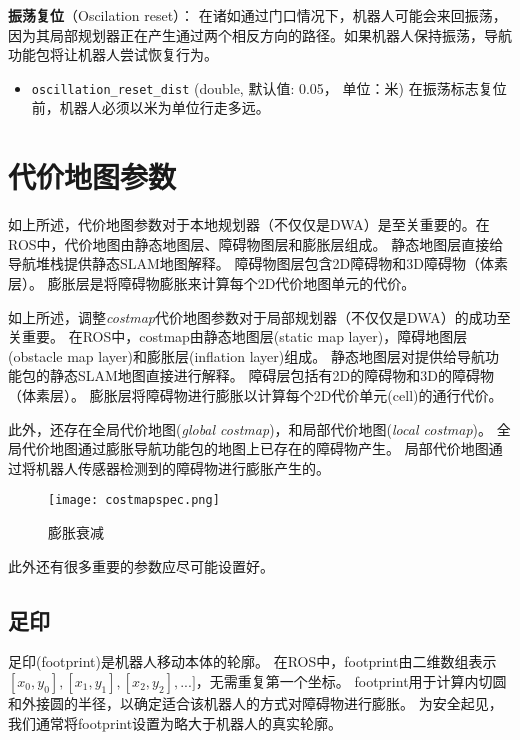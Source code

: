 \textbf{振荡复位}（Oscilation reset）：
在诸如通过门口情况下，机器人可能会来回振荡，因为其局部规划器正在产生通过两个相反方向的路径。如果机器人保持振荡，导航功能包将让机器人尝试恢复行为。

\begin{itemize}
	\item \texttt{oscillation_reset_dist} (double, 默认值: 0.05， 单位：米) 
	在振荡标志复位前，机器人必须以米为单位行走多远。
\end{itemize}



\section[Costmap Parameters]{代价地图参数}
如上所述，代价地图参数对于本地规划器（不仅仅是DWA）是至关重要的。在ROS中，代价地图由静态地图层、障碍物图层和膨胀层组成。
静态地图层直接给导航堆栈提供静态SLAM地图解释。
障碍物图层包含2D障碍物和3D障碍物（体素层）。
膨胀层是将障碍物膨胀来计算每个2D代价地图单元的代价。

如上所述，调整\textit{costmap}代价地图参数对于局部规划器（不仅仅是DWA）的成功至关重要。 
在ROS中，costmap由静态地图层(static map layer)，障碍地图层(obstacle map layer)和膨胀层(inflation layer)组成。 
静态地图层对提供给导航功能包的静态SLAM地图直接进行解释。 
障碍层包括有2D的障碍物和3D的障碍物（体素层）。 
膨胀层将障碍物进行膨胀以计算每个2D代价单元(cell)的通行代价。

此外，还存在全局代价地图(\textit{global costmap})，和局部代价地图(\textit{local costmap})。
全局代价地图通过膨胀导航功能包的地图上已存在的障碍物产生。
局部代价地图通过将机器人传感器检测到的障碍物进行膨胀产生的。

\begin{figure}[!h]
	\texttt{[image: costmapspec.png]}
	\caption{膨胀衰减}
\end{figure}

\noindent 此外还有很多重要的参数应尽可能设置好。

\subsection[footprint]{足印}%

足印(footprint)是机器人移动本体的轮廓。
在ROS中，footprint由二维数组表示 $[x_0, y_0], [x_1,y_1], [x_2,y_2], ...]$，无需重复第一个坐标。
footprint用于计算内切圆和外接圆的半径，以确定适合该机器人的方式对障碍物进行膨胀。
为安全起见，我们通常将footprint设置为略大于机器人的真实轮廓。

